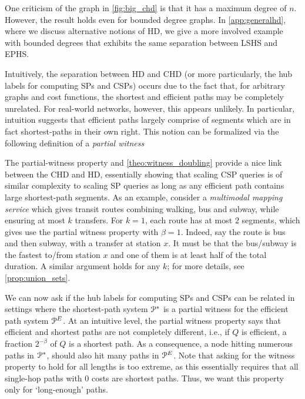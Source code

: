 \begin{remark}
One criticism of the graph in \cref{fig:big_chd} is that it has a maximum degree of $n$.
However, the result holds even for bounded degree graphs.
In \cref{app:generalhd}, where we discuss alternative notions of HD, we give a more involved example with bounded degrees that exhibits the same separation between LSHS and EPHS.
\end{remark}

Intuitively, the separation between HD and CHD (or more particularly, the hub labels for computing SPs and CSPs) occurs due to the fact that, for arbitrary graphs and cost functions, the shortest and efficient paths may be completely unrelated. 
For real-world networks, however, this appears unlikely.
In particular, intuition suggests that efficient paths largely comprise of segments which are in fact shortest-paths in their own right. 
This notion can be formalized via the following definition of a \emph{partial witness} 

The partial-witness property and \cref{theo:witness_doubling} provide a nice link between the CHD and HD, essentially showing that scaling CSP queries is of similar complexity to scaling SP queries as long as any efficient path contains large shortest-path segments. 
As an example, consider a \emph{multimodal mapping service} which gives transit routes combining walking, bus and subway, while ensuring at most $k$ transfers. 
For $k=1$, each route has at most $2$ segments, which gives use the partial witness property with $\beta = 1$.
Indeed, say the route is bus and then subway, with a transfer at station $x$. 
It must be that the bus/subway is the fastest to/from station $x$ and one of them is at least half of the total duration.
A similar argument holds for any $k$; for more details, see \cref{prop:union_sets}.

We can now ask if the hub labels for computing SPs and CSPs can be related in settings where the shortest-path system $\mathcal{P}^*$ is a partial witness for the efficient path system $\mathcal{P}^E$.
At an intuitive level, the partial witness property says that efficient and shortest paths are not completely different, i.e., if $Q$ is efficient, a fraction $2^{-\beta}$ of $Q$ is a shortest path.
As a consequence, a node hitting numerous paths in $\mathcal{P}^*$, should also hit many paths in $\mathcal{P}^E$.
Note that asking for the witness property to hold for all lengths is too extreme, as this essentially requires that all single-hop paths with 0 costs are shortest paths.
Thus, we want this property only for `long-enough' paths. 

